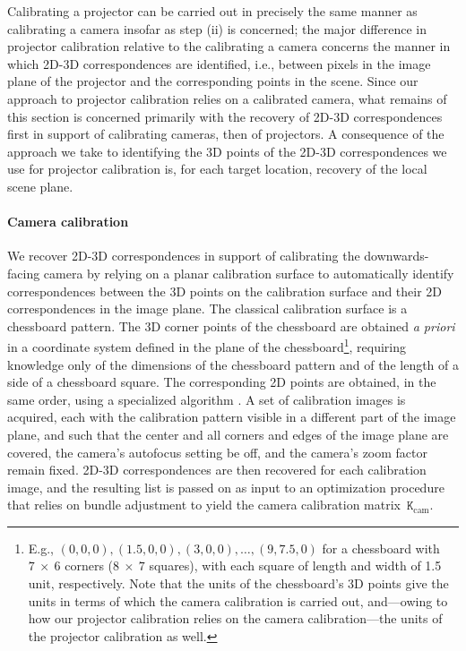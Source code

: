 \documentclass[review]{elsarticle}
\begin{document}
Calibrating a projector \cite{moreno2012simple,zhang2009projector,zhang2006novel} can be carried out in precisely the same manner as calibrating a camera insofar as step (ii) is concerned; the major difference in projector calibration relative to the calibrating a camera concerns the manner in which 2D-3D correspondences are identified, i.e., between pixels in the image plane of the projector and the corresponding points in the scene. Since our approach to projector calibration relies on a calibrated camera, what remains of this section is concerned primarily with the recovery of 2D-3D correspondences first in support of calibrating cameras, then of projectors. A consequence of the approach we take to identifying the 3D points of the 2D-3D correspondences we use for projector calibration is, for each target location, recovery of the local scene plane. 

\paragraph{Camera calibration} We recover 2D-3D correspondences in support of calibrating the downwards-facing camera by relying on a planar calibration surface to automatically identify correspondences between the 3D points on the calibration surface and their 2D correspondences in the image plane. The classical calibration surface is a chessboard pattern. The 3D corner points of the chessboard are obtained \textit{a priori} in a coordinate system defined in the plane of the chessboard\footnote{E.g., $(0,0,0), (1.5,0,0), (3,0,0), \dots, (9,7.5,0)$ for a chessboard with $7~\times{}~6$ corners ($8~\times{}~7$ squares), with each square of length and width of 1.5 unit, respectively. Note that the units of the chessboard's 3D points give the units in terms of which the camera calibration is carried out, and---owing to how our projector calibration relies on the camera calibration---the units of the projector calibration as well.}, requiring knowledge only of the dimensions of the chessboard pattern and of the length of a side of a chessboard square. The corresponding 2D points are obtained, in the same order, using a specialized algorithm \cite{bradski2000opencv}. A set of calibration images is acquired, each with the calibration pattern visible in a different part of the image plane, and such that the center and all corners and edges of the image plane are covered, the camera's autofocus setting be off, and the camera's zoom factor remain fixed. 2D-3D correspondences are then recovered for each calibration image, and the resulting list is passed on as input to an optimization procedure that relies on bundle adjustment to yield the camera calibration matrix~$\mathtt{K}_\text{cam}$. 
\end{document}
